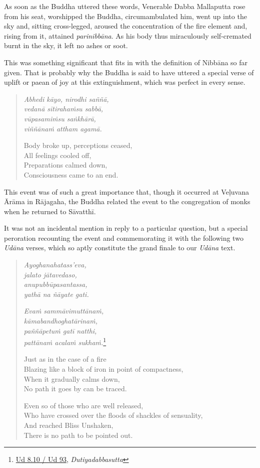 As soon as the Buddha uttered these words, Venerable Dabba Mallaputta rose from his seat, worshipped the Buddha, circumambulated him, went up into the sky and, sitting cross-legged, aroused the concentration of the fire element and, rising from it, attained \emph{parinibbāna}. As his body thus miraculously self-cremated burnt in the sky, it left no ashes or soot.

This was something significant that fits in with the definition of Nibbāna so far given. That is probably why the Buddha is said to have uttered a special verse of uplift or paean of joy at this extinguishment, which was perfect in every sense.

\begin{quote}
\emph{Abhedi kāyo, nirodhi saññā,}\\
\emph{vedanā sītirahaṁsu sabbā,}\\
\emph{vūpasamiṁsu saṅkhārā,}\\
\emph{viññānaṁ attham agamā.}

Body broke up, perceptions ceased,\\
All feelings cooled off,\\
Preparations calmed down,\\
Consciousness came to an end.
\end{quote}

This event was of such a great importance that, though it occurred at Veḷuvana Ārāma in Rājagaha, the Buddha related the event to the congregation of monks when he returned to Sāvatthī.

It was not an incidental mention in reply to a particular question, but a special peroration recounting the event and commemorating it with the following two \emph{Udāna} verses, which so aptly constitute the grand finale to our \emph{Udāna} text.

\begin{quote}
\emph{Ayoghanahatass'eva,}\\
\emph{jalato jātavedaso,}\\
\emph{anupubbūpasantassa,}\\
\emph{yathā na ñāyate gati.}

\emph{Evaṁ sammāvimuttānaṁ,}\\
\emph{kāmabandhoghatārinaṁ,}\\
\emph{paññāpetuṁ gatī natthi,}\\
\emph{pattānaṁ acalaṁ sukhaṁ.}\footnote{\href{https://suttacentral.net/ud8.10/pli/ms}{Ud 8.10 / Ud 93}, \emph{Dutiyadabbasutta}}

Just as in the case of a fire\\
Blazing like a block of iron in point of compactness,\\
When it gradually calms down,\\
No path it goes by can be traced.

Even so of those who are well released,\\
Who have crossed over the floods of shackles of sensuality,\\
And reached Bliss Unshaken,\\
There is no path to be pointed out.
\end{quote}

